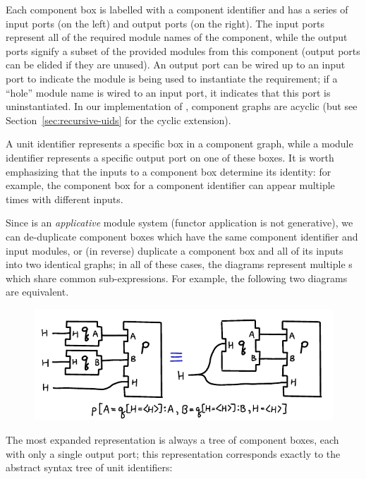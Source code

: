 \noindent
Each component box is labelled with a component identifier and has a
series of input ports (on the left) and output ports (on the right). The
input ports represent all of the required module names of the component,
while the output ports signify a subset of the provided modules from
this component (output ports can be elided if they are unused). An
output port can be wired up to an input port to indicate the module is
being used to instantiate the requirement; if a ``hole'' module name is
wired to an input port, it indicates that this port is uninstantiated.
In our implementation of \Backpack{}, component graphs are acyclic
(but see Section~\ref{sec:recursive-uids} for the cyclic extension).

A unit identifier represents a specific box in a component graph, while
a module identifier represents a specific output port on one of these
boxes. It is worth emphasizing that the inputs to a component box
determine its identity: for example, the component box for a component
identifier can appear multiple times with different inputs.

Since \Backpack{} is an \emph{applicative} module system (functor
application is not generative), we can de-duplicate component boxes which
have the same component identifier and input modules, or (in reverse)
duplicate a component box and all of its inputs into two identical
graphs; in all of these cases, the diagrams represent multiple \uid{}s
which share common sub-expressions.  For example, the following
two diagrams are equivalent.

\begin{figure}[H]
\center\includegraphics{figures/unit-identifier-pictorial-equivalence-example-2.pdf}
\end{figure}

The most expanded representation is always a tree of component boxes, each
with only a single output port; this representation corresponds exactly
to the abstract syntax tree of unit identifiers:

